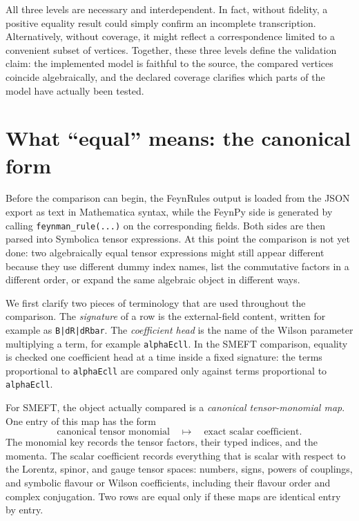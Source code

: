 All three levels are necessary and interdependent. In fact, without fidelity, a positive equality result could simply confirm an incomplete transcription. Alternatively, without coverage, it might reflect a correspondence limited to a convenient subset of vertices. Together, these three levels define the validation claim: the implemented model is faithful to the source, the compared vertices coincide algebraically, and the declared coverage clarifies which parts of the model have actually been tested.


\section{What ``equal'' means: the canonical form}
\label{sec:validation-canonical}

Before the comparison can begin, the FeynRules output is loaded from the JSON export as text in Mathematica syntax, while the FeynPy side is generated by calling \texttt{feynman\_rule(...)} on the corresponding fields. Both sides are then parsed into Symbolica tensor expressions. At this point the comparison is not yet done: two algebraically equal tensor expressions might still appear different because they use different dummy index names, list the commutative factors in a different order, or expand the same algebraic object in different ways.

We first clarify two pieces of terminology that are used throughout the comparison. The \emph{signature} of a row is the external-field content, written for example as \texttt{B|dR|dRbar}. The \emph{coefficient head} is the name of the Wilson parameter multiplying a term, for example \texttt{alphaEcll}. In the SMEFT comparison, equality is checked one coefficient head at a time inside a fixed signature: the terms proportional to \texttt{alphaEcll} are compared only against terms proportional to \texttt{alphaEcll}.

For SMEFT, the object actually compared is a \emph{canonical tensor-monomial map}. One entry of this map has the form
\begin{equation}
    \text{canonical tensor monomial}
    \quad \longmapsto \quad
    \text{exact scalar coefficient}.
\end{equation}
The monomial key records the tensor factors, their typed indices, and the momenta. The scalar coefficient records everything that is scalar with respect to the Lorentz, spinor, and gauge tensor spaces: numbers, signs, powers of couplings, and symbolic flavour or Wilson coefficients, including their flavour order and complex conjugation. Two rows are equal only if these maps are identical entry by entry.

